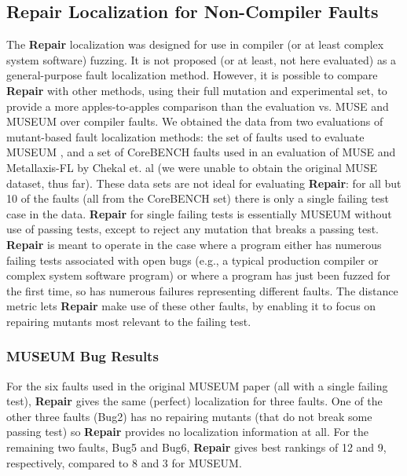 \subsection{Repair Localization for Non-Compiler Faults}

The {\bf Repair} localization was designed for use in compiler (or at least complex system software) fuzzing.  It is not proposed (or at least, not here evaluated) as a general-purpose fault localization method.  However, it is possible to compare {\bf Repair} with other methods, using their full mutation and experimental set, to provide a more apples-to-apples comparison than the evaluation vs. MUSE and MUSEUM over compiler faults.  We obtained the data from two evaluations of mutant-based fault localization methods:  the set of faults used to evaluate MUSEUM \cite{multilingual}, and a set of CoreBENCH \cite{CoreBENCH} faults used in an evaluation of MUSE and Metallaxis-FL by Chekal et. al \cite{Papadakis} (we were unable to obtain the original MUSE dataset, thus far).  These data sets are not ideal for evaluating {\bf Repair}: for all but 10 of the faults (all from the CoreBENCH set) there is only a single failing test case in the data.  {\bf Repair} for single failing tests is essentially MUSEUM without use of passing tests, except to reject any mutation that breaks a passing test.  {\bf Repair} is meant to operate in the case where a program either has numerous failing tests associated with open bugs (e.g., a typical production compiler or complex system software program) or where a program has just been fuzzed for the first time, so has numerous failures representing different faults.  The distance metric lets {\bf Repair} make use of these other faults, by enabling it to focus on repairing mutants most relevant to the failing test.

\subsubsection{MUSEUM Bug Results}  For the six faults used in the original MUSEUM paper (all with a single failing test), {\bf Repair} gives the same (perfect) localization for three faults.  One of the other three faults (Bug2) has no repairing mutants (that do not break some passing test) so {\bf Repair} provides no localization information at all.  For the remaining two faults, Bug5 and Bug6, {\bf Repair} gives best rankings of 12 and 9, respectively, compared to 8 and 3 for MUSEUM.

